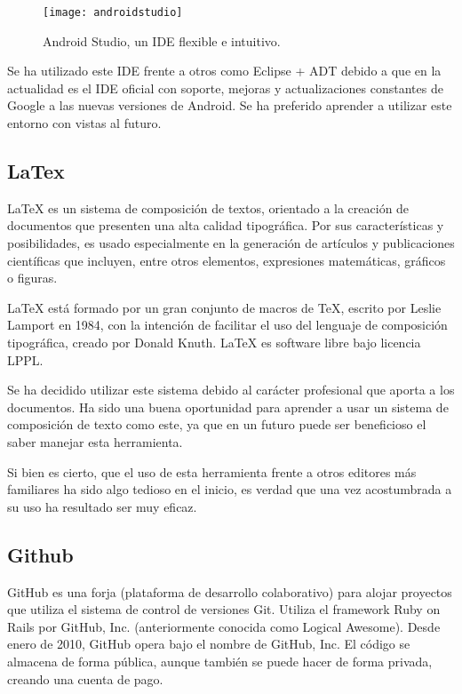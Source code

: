 \begin{figure}[h]
	\centering
	\texttt{[image: androidstudio]}
	\caption{Android Studio, un IDE flexible e intuitivo.}
	\label{fig:androidstudio}
\end{figure}

Se ha utilizado este IDE frente a otros como Eclipse + ADT \cite{URL::eclipseADT} debido a que en la actualidad es el IDE oficial con soporte, mejoras y actualizaciones constantes de Google a las nuevas versiones de Android. Se ha preferido aprender a utilizar este entorno con vistas al futuro.


\subsection{LaTex}

LaTeX es un sistema de composición de textos, orientado a la creación de documentos que presenten una alta calidad tipográfica. Por sus características y posibilidades, es usado especialmente en la generación de artículos y publicaciones científicas que incluyen, entre otros elementos, expresiones matemáticas, gráficos o figuras.


LaTeX está formado por un gran conjunto de macros de TeX, escrito por Leslie Lamport en 1984, con la intención de facilitar el uso del lenguaje de composición tipográfica, creado por Donald Knuth. LaTeX es software libre bajo licencia LPPL.


Se ha decidido utilizar este sistema debido al carácter profesional que aporta a los documentos. Ha sido una buena oportunidad para aprender a usar un sistema de composición de texto como este, ya que en un futuro puede ser beneficioso el saber manejar esta herramienta. 

Si bien es cierto, que el uso de esta herramienta frente a otros editores más familiares ha sido algo tedioso en el inicio, es verdad que una vez acostumbrada a su uso ha resultado ser muy eficaz.

\vskip 0.5in

\subsection{Github}

GitHub\cite{URL::Github} es una forja (plataforma de desarrollo colaborativo) para alojar proyectos que utiliza el sistema de control de versiones Git. Utiliza el framework Ruby on Rails por GitHub, Inc. (anteriormente conocida como Logical Awesome). Desde enero de 2010, GitHub opera bajo el nombre de GitHub, Inc. El código se almacena de forma pública, aunque también se puede hacer de forma privada, creando una cuenta de pago.



